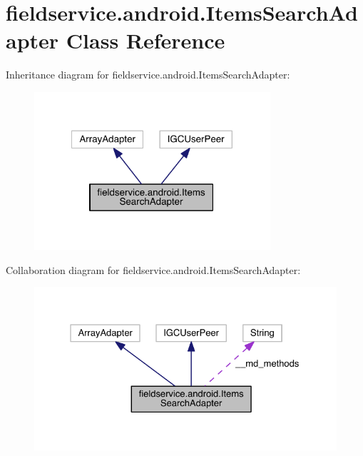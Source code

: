 \hypertarget{classfieldservice_1_1android_1_1_items_search_adapter}{\section{fieldservice.\+android.\+Items\+Search\+Adapter Class Reference}
\label{classfieldservice_1_1android_1_1_items_search_adapter}
}


Inheritance diagram for fieldservice.\+android.\+Items\+Search\+Adapter\+:
\nopagebreak
\begin{figure}[H]
\begin{center}
\leavevmode
\includegraphics[width=248pt]{classfieldservice_1_1android_1_1_items_search_adapter__inherit__graph}
\end{center}
\end{figure}


Collaboration diagram for fieldservice.\+android.\+Items\+Search\+Adapter\+:
\nopagebreak
\begin{figure}[H]
\begin{center}
\leavevmode
\includegraphics[width=327pt]{classfieldservice_1_1android_1_1_items_search_adapter__coll__graph}
\end{center}
\end{figure}
